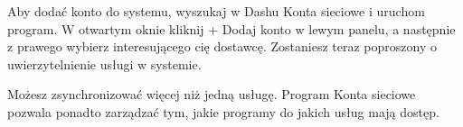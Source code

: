 \begin{center}
\end{center}

Aby dodać konto do systemu, wyszukaj w Dashu \textcolor{ubuntu_orange}{Konta sieciowe} i uruchom program. W otwartym oknie kliknij \textcolor{ubuntu_orange}{+ Dodaj konto}  w lewym panelu, a następnie z prawego wybierz interesującego cię dostawcę. Zostaniesz teraz poproszony o uwierzytelnienie usługi w systemie.

Możesz zsynchronizować więcej niż jedną usługę. Program \textcolor{ubuntu_orange}{Konta sieciowe} pozwala ponadto zarządzać tym, jakie programy do jakich usług mają dostęp. 
